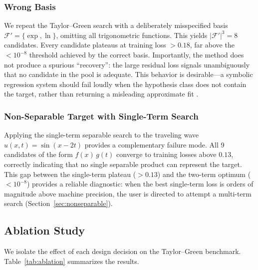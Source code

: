 \subsubsection{Wrong Basis}
\label{sec:wrong_basis}

We repeat the Taylor--Green search with a deliberately misspecified basis
$\mathcal{F}' = \{\exp, \ln\}$, omitting all trigonometric functions.  This
yields $|\mathcal{F}'|^3 = 8$ candidates.  Every candidate plateaus at
training loss $> 0.18$, far above the $< 10^{-8}$ threshold achieved by the
correct basis.  Importantly, the method does not produce a spurious
``recovery'': the large residual loss signals unambiguously that no candidate
in the pool is adequate.  This behavior is desirable---a symbolic regression
system should fail loudly when the hypothesis class does not contain the
target, rather than returning a misleading approximate fit
\citep{cranmer2023}.

\subsubsection{Non-Separable Target with Single-Term Search}
\label{sec:nonsep_failure}

Applying the single-term separable search to the traveling wave
$u(x,t) = \sin(x - 2t)$ provides a complementary failure mode.  All 9
candidates of the form $f(x)\,g(t)$ converge to training losses above $0.13$,
correctly indicating that no single separable product can represent the
target.  This gap between the single-term plateau ($>0.13$) and the two-term
optimum ($<10^{-8}$) provides a reliable diagnostic: when the best single-term
loss is orders of magnitude above machine precision, the user is directed to
attempt a multi-term search (Section~\ref{sec:nonseparable}).

\subsection{Ablation Study}
\label{sec:ablation}

We isolate the effect of each design decision on the Taylor--Green benchmark.
Table~\ref{tab:ablation} summarizes the results.

